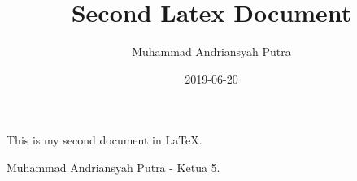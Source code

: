 \documentclass{article}
\title{Second Latex Document}
\date{2019-06-20}
\author{Muhammad Andriansyah Putra}
\begin{document}
  \maketitle
  \newpage

  This is my second document in \LaTeX.  
  
  Muhammad Andriansyah Putra - Ketua 5.
\end{document}
